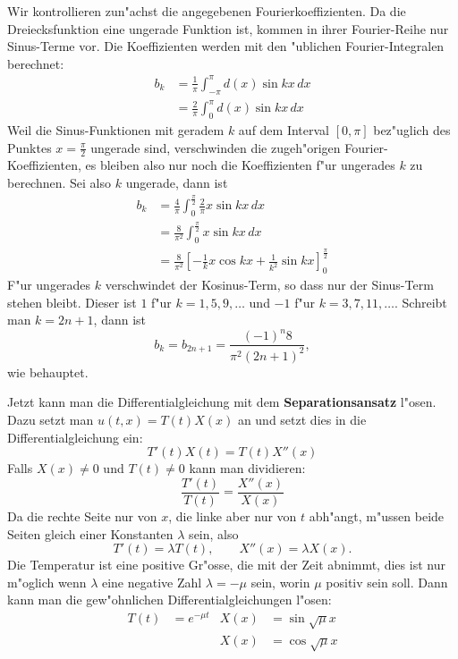 \begin{loesung}
Wir kontrollieren zun"achst die angegebenen Fourierkoeffizienten.
Da die Dreiecksfunktion eine ungerade Funktion ist, kommen in ihrer
Fourier-Reihe nur Sinus-Terme vor. Die Koeffizienten werden mit
den "ublichen Fourier-Integralen berechnet:
\begin{align*}
b_k&=\frac{1}{\pi}\int_{-\pi}^{\pi} d(x)\sin kx\,dx\\
&=\frac{2}{\pi}\int_{0}^{\pi} d(x)\sin kx\,dx
\end{align*}
Weil die Sinus-Funktionen mit geradem $k$ auf dem Interval $[0,\pi]$
bez"uglich des Punktes $x=\frac{\pi}2$ ungerade sind, verschwinden die
zugeh"origen Fourier-Koeffizienten, es bleiben also nur noch die
Koeffizienten f"ur ungerades $k$ zu berechnen. Sei also $k$ ungerade, dann
ist
\begin{align*}
b_k
&=
\frac{4}{\pi}\int_0^{\frac{\pi}2} \frac{2}{\pi}x\sin kx\,dx
\\
&=
\frac{8}{\pi^2}\int_0^{\frac{\pi}2} x\sin kx\,dx
\\
&=
\frac{8}{\pi^2}\left[ -\frac{1}kx\cos kx+\frac1{k^2}\sin kx\right]_0^{\frac{\pi}2}
\end{align*}
F"ur ungerades $k$ verschwindet der Kosinus-Term, so dass nur der Sinus-Term
stehen bleibt. Dieser ist $1$ f"ur $k=1,5,9,\dots$ und $-1$ f"ur $k=3,7,11,\dots$.
Schreibt man $k=2n+1$, dann ist
\[
b_k=b_{2n+1}=\frac{(-1)^n8}{\pi^2(2n+1)^2},
\]
wie behauptet.

Jetzt kann man die Differentialgleichung mit dem {\bf Separationsansatz}
l"osen. Dazu setzt man $u(t,x)=T(t)X(x)$ an und setzt dies in die
Differentialgleichung ein:
\[
T'(t)X(t)=T(t)X''(x)
\]
Falls $X(x)\ne 0$ und $T(t)\ne 0$ kann man dividieren:
\[
\frac{T'(t)}{T(t)}=\frac{X''(x)}{X(x)}
\]
Da die rechte Seite nur von $x$, die linke aber nur von $t$ abh"angt,
m"ussen beide Seiten gleich einer Konstanten $\lambda$ sein, also
\[
T'(t)=\lambda T(t),\qquad X''(x)=\lambda X(x).
\]
Die Temperatur ist eine positive Gr"osse, die mit der Zeit abnimmt,
dies ist nur m"oglich wenn $\lambda$ eine negative Zahl $\lambda=-\mu$
sein, worin $\mu$ positiv sein soll. Dann kann man die gew"ohnlichen
Differentialgleichungen l"osen:
\begin{align*}
T(t)&=e^{-\mu t}&X(x)&=\sin\sqrt{\mu}x\\
    &            &X(x)&=\cos\sqrt{\mu}x
\end{align*}


\end{loesung}
